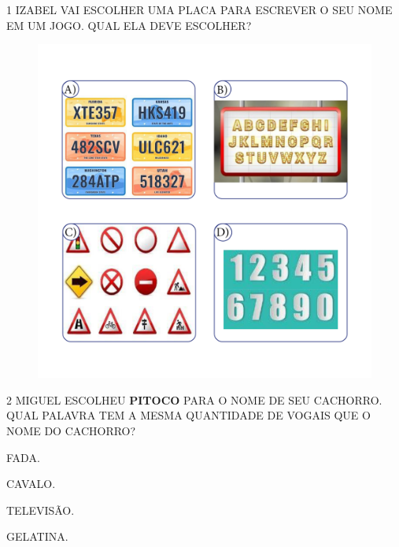 

\pagebreak

\num{1} IZABEL VAI ESCOLHER UMA PLACA PARA ESCREVER O SEU NOME EM UM JOGO. QUAL ELA DEVE ESCOLHER?

\begin{figure}[H]
\includegraphics[width=\textwidth]{media/image222a225.png}
\end{figure}

\num{2} MIGUEL ESCOLHEU \textbf{PITOCO} PARA O NOME DE SEU CACHORRO.
QUAL PALAVRA TEM A MESMA QUANTIDADE DE VOGAIS QUE O NOME DO CACHORRO?

\begin{escolha}
\item FADA.

\item CAVALO.

\item TELEVISÃO.

\item GELATINA.
\end{escolha}

